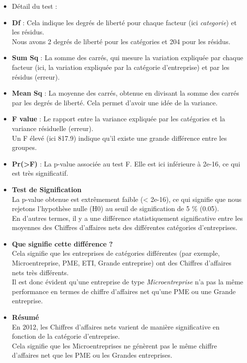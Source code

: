 \documentclass[mstat,12pt]{unswthesis}
\begin{document}
\begin{itemize}
\item
  Détail du test :
\item
  \textbf{Df} : Cela indique les degrés de liberté pour chaque facteur
  (ici \emph{categorie}) et les résidus.\\
  Nous avons 2 degrés de liberté pour les catégories et 204 pour les
  résidus.
\item
  \textbf{Sum Sq} : La somme des carrés, qui mesure la variation
  expliquée par chaque facteur (ici, la variation expliquée par la
  catégorie d'entreprise) et par les résidus (erreur).
\item
  \textbf{Mean Sq} : La moyenne des carrés, obtenue en divisant la somme
  des carrés par les degrés de liberté. Cela permet d'avoir une idée de
  la variance.
\item
  \textbf{F value} : Le rapport entre la variance expliquée par les
  catégories et la variance résiduelle (erreur).\\
  Un F élevé (ici 817.9) indique qu'il existe une grande différence
  entre les groupes.
\item
  \textbf{Pr(\textgreater F)} : La p-value associée au test F. Elle est
  ici inférieure à 2e-16, ce qui est très significatif.
\item
  \textbf{Test de Signification}\\
  La p-value obtenue est extrêmement faible (\textless{} 2e-16), ce qui
  signifie que nous rejetons l'hypothèse nulle (H0) au seuil de
  signification de 5 \% (0.05).\\
  En d'autres termes, il y a une différence statistiquement
  significative entre les moyennes des Chiffres d'affaires nets des
  différentes catégories d'entreprises.
\item
  \textbf{Que signifie cette différence ?}\\
  Cela signifie que les entreprises de catégories différentes (par
  exemple, Microentreprise, PME, ETI, Grande entreprise) ont des
  Chiffres d'affaires nets très différents.\\
  Il est donc évident qu'une entreprise de type \emph{Microentreprise}
  n'a pas la même performance en termes de chiffre d'affaires net qu'une
  PME ou une Grande entreprise.
\item
  \textbf{Résumé}\\
  En 2012, les Chiffres d'affaires nets varient de manière significative
  en fonction de la catégorie d'entreprise.\\
  Cela signifie que les Microentreprises ne génèrent pas le même chiffre
  d'affaires net que les PME ou les Grandes entreprises.
\end{itemize}
\end{document}
